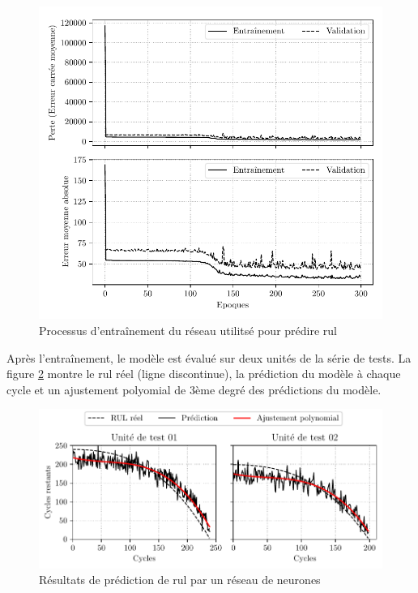 \begin{figure}[H]
    \centering
    \includegraphics{figures/cmapss_regression_training_fr.pdf}
    \caption{Processus d'entraînement du réseau utilitsé pour prédire \acrshort{rul}}
    \label{fig:cmapss-regression-training}
\end{figure}

Après l'entraînement, le modèle est évalué sur deux unités de la série de tests. La figure \ref{fig:cmapss-regression-prediction} montre le \acrshort{rul} réel (ligne discontinue), la prédiction du modèle à chaque cycle et un ajustement polyomial de 3ème degré des prédictions du modèle.

\begin{figure}[H]
    \centering
    \includegraphics{figures/cmapss_regression_predictions_fr.pdf}
    \caption{Résultats de prédiction de \acrshort{rul} par un réseau de neurones}
    \label{fig:cmapss-regression-prediction}
\end{figure}

